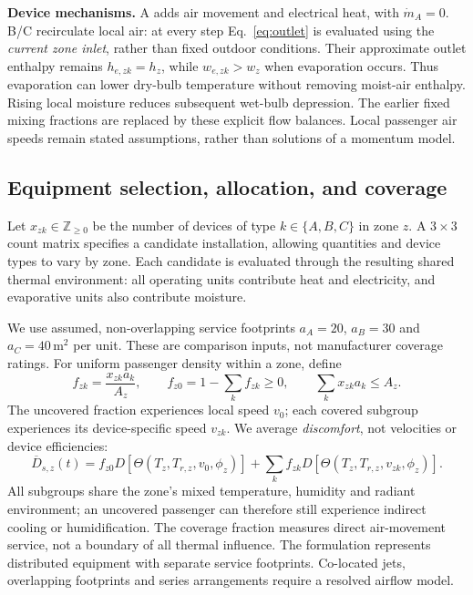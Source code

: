 \noindent\textbf{Device mechanisms.} A adds air movement and electrical heat, with $\dot m_A=0$. B/C recirculate local air: at every step Eq.~\eqref{eq:outlet} is evaluated using the \emph{current zone inlet}, rather than fixed outdoor conditions. Their approximate outlet enthalpy remains $h_{e,zk}=h_z$, while $w_{e,zk}>w_z$ when evaporation occurs. Thus evaporation can lower dry-bulb temperature without removing moist-air enthalpy. Rising local moisture reduces subsequent wet-bulb depression. The earlier fixed mixing fractions are replaced by these explicit flow balances. Local passenger air speeds remain stated assumptions, rather than solutions of a momentum model.

\subsection{Equipment selection, allocation, and coverage}

Let $x_{zk}\in\mathbb Z_{\ge0}$ be the number of devices of type $k\in\{A,B,C\}$ in zone $z$. A $3\times3$ count matrix specifies a candidate installation, allowing quantities and device types to vary by zone. Each candidate is evaluated through the resulting shared thermal environment: all operating units contribute heat and electricity, and evaporative units also contribute moisture.

We use assumed, non-overlapping service footprints $a_A=20$, $a_B=30$ and $a_C=40\,\mathrm{m^2}$ per unit. These are comparison inputs, not manufacturer coverage ratings. For uniform passenger density within a zone, define
\begin{equation}
 f_{zk}=\frac{x_{zk}a_k}{A_z},\qquad
 f_{z0}=1-\sum_k f_{zk}\ge0,\qquad \sum_kx_{zk}a_k\le A_z.
\label{eq:coverage}
\end{equation}
The uncovered fraction experiences local speed $v_0$; each covered subgroup experiences its device-specific speed $v_{zk}$. We average \emph{discomfort}, not velocities or device efficiencies:
\begin{equation}
 \overline D_{s,z}(t)=f_{z0}D[\Theta(T_z,T_{r,z},v_0,\phi_z)]
 +\sum_k f_{zk}D[\Theta(T_z,T_{r,z},v_{zk},\phi_z)].
\label{eq:mixed-discomfort}
\end{equation}
All subgroups share the zone's mixed temperature, humidity and radiant environment; an uncovered passenger can therefore still experience indirect cooling or humidification. The coverage fraction measures direct air-movement service, not a boundary of all thermal influence. The formulation represents distributed equipment with separate service footprints. Co-located jets, overlapping footprints and series arrangements require a resolved airflow model.

